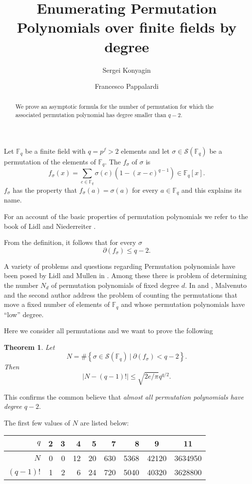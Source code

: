 \documentclass{amsart}
\title{Enumerating Permutation Polynomials over finite fields
by degree}
\author{Sergei Konyagin}
\author{Francesco Pappalardi}
\newtheorem{Theorem}{Theorem}
\begin{document}
\begin{abstract}
We prove an asymptotic formula for the number of permutation for
which the associated permutation polynomial has degree smaller
than $q-2$.
\end{abstract}
\maketitle

Let $\mathbb F_q$ be a finite field with $q=p^f>2$ elements and
let $\sigma\in\mathcal S(\mathbb F_q)$ be a permutation of the
elements of $\mathbb F_q$. The 
$f_\sigma$ of $\sigma$ is
$$f_\sigma(x)=\sum_{c\in \mathbb F_q} \sigma(c)\left(1-(x-c)^{q-1}
\right)\in\mathbb F_q[x].$$
$f_\sigma$ has the  property that $f_\sigma(a)=\sigma(a)$ for every $a\in
\mathbb F_q$ and this explains its name.

For an account of the basic properties of permutation polynomials
we refer to the book of Lidl and  Niederreiter \cite{LN}.

{From} the definition, it follows that for every $\sigma$
$$\partial(f_\sigma)\leq q-2.$$

A variety of problems and questions regarding Permutation
polynomials have been posed by Lidl and Mullen in \cite{LM1,LM2}.
Among these there is problem of determining the number $N_d$ of
permutation polynomials of fixed degree $d$. In \cite{CP} and
\cite{CP1}, Malvenuto and the second author address the problem of
counting the permutations that move a fixed number of elements of
$\mathbb F_q$ and whose permutation polynomials have ``low''
degree.

Here we consider all permutations and we want to prove the following

\begin{Theorem}
Let
$$N=\#\left\{\sigma\in\mathcal S(\mathbb F_q)\ |\
\partial(f_\sigma)< q-2\right\}.$$
Then
$$|N-(q-1)!| \leq \sqrt{2e/\pi}q^{q/2}.$$
\end{Theorem}

This confirms the common believe that \textsl{almost all
permutation polynomials have degree $q-2$}.
\bigskip

The first few values of $N$ are listed below:\bigskip

\begin{center}
\begin{tabular}{|r|r|r|r|r|r|r|c|c|} \hline
      $q$ & 2 & 3 &  4 &  5 &   7 &    8 &   9   &   11    \\
\hline
      $N$ & 0 & 0 & 12 & 20 & 630 & 5368 & 42120 & 3634950 \\
\hline
 $(q-1)!$ & 1 & 2 &  6 & 24 & 720 & 5040 & 40320 & 3628800 \\
\hline \end{tabular} \end{center}\bigskip
\end{document}
